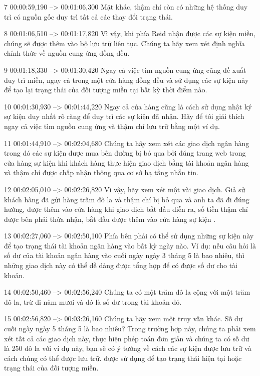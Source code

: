 7
00:00:59,190 --> 00:01:06,300
Mặt khác, thậm chí còn có những hệ thống duy trì có nguồn gốc duy trì tất cả các thay đổi trạng thái.

8
00:01:06,510 --> 00:01:17,820
Vì vậy, khi phía Reid nhận được các sự kiện miền, chúng sẽ được thêm vào bộ lưu trữ liên tục.  Chúng ta hãy xem xét định nghĩa chính thức về nguồn cung ứng đồng đều.

9
00:01:18,330 --> 00:01:30,420
Ngay cả việc tìm nguồn cung ứng cũng đề xuất duy trì miền, ngay cả trong một cửa hàng đồng đều và sử dụng các sự kiện này để tạo lại trạng thái của đối tượng miền tại bất kỳ thời điểm nào.

10
00:01:30,930 --> 00:01:44,220
Ngay cả cửa hàng cũng là cách sử dụng nhật ký sự kiện duy nhất rõ ràng để duy trì các sự kiện đã nhận.  Hãy để tôi giải thích ngay cả việc tìm nguồn cung ứng và thậm chí lưu trữ bằng một ví dụ.

11
00:01:44,910 --> 00:02:04,680
Chúng ta hãy xem xét các giao dịch ngân hàng trong đó các sự kiện được mua bên đường bị bỏ qua bởi đúng trang web trong cửa hàng sự kiện khi khách hàng thực hiện giao dịch bằng tài khoản ngân hàng và thậm chí được chấp nhận thông qua cơ sở hạ tầng nhắn tin.

12
00:02:05,010 --> 00:02:26,820
Vì vậy, hãy xem xét một vài giao dịch.  Giả sử khách hàng đã gửi hàng trăm đô la và thậm chí bị bỏ qua và anh ta đã đi đúng hướng, được thêm vào cửa hàng khi giao dịch bắt đầu diễn ra, số tiền thậm chí được bên phải thừa nhận, bắt đầu được thêm vào cửa hàng sự kiện  .

13
00:02:27,060 --> 00:02:50,100
Phía bên phải có thể sử dụng những sự kiện này để tạo trạng thái tài khoản ngân hàng vào bất kỳ ngày nào.  Ví dụ: nếu câu hỏi là số dư của tài khoản ngân hàng vào cuối ngày ngày 3 tháng 5 là bao nhiêu, thì những giao dịch này có thể dễ dàng được tổng hợp để có được số dư cho tài khoản.

14
00:02:50,460 --> 00:02:56,240
Chúng ta có một trăm đô la cộng với một trăm đô la, trừ đi năm mươi và đó là số dư trong tài khoản đó.

15
00:02:56,820 --> 00:03:26,160
Chúng ta hãy xem một truy vấn khác.  Số dư cuối ngày ngày 5 tháng 5 là bao nhiêu?  Trong trường hợp này, chúng ta phải xem xét tất cả các giao dịch này, thực hiện phép toán đơn giản và chúng ta có số dư là 250 đô la với ví dụ này, bạn sẽ có ý tưởng về cách các sự kiện được lưu trữ và cách chúng có thể được lưu trữ.  được sử dụng để tạo trạng thái hiện tại hoặc trạng thái của đối tượng miền.

